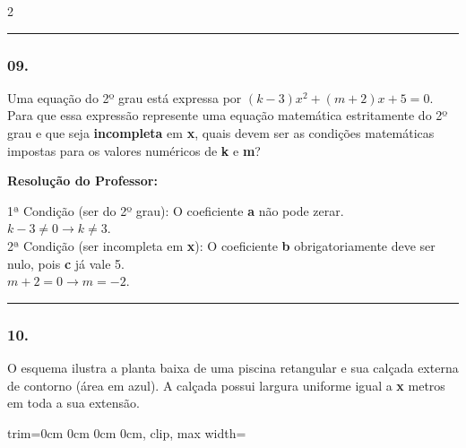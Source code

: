\begin{multicols*}{2}
\par\vspace{\espacoQuestao}

\noindent\textcolor{CorLinha}{\rule{\linewidth}{0.5pt}} 
\par\vspace{\espacoPreQuestao}
\subsubsection*{09.} Uma equação do 2º grau está expressa por $ (k - 3)x^2 + (m + 2)x + 5 = 0 $. Para que essa expressão represente uma equação matemática estritamente do 2º grau e que seja \textbf{incompleta} em \textbf{x}, quais devem ser as condições matemáticas impostas para os valores numéricos de \textbf{k} e \textbf{m}?

\ifgabarito
    \begin{tcolorbox}[colback=CorTitUm!5, colframe=CorTitUm, boxrule=1pt, arc=4pt, left=6pt, right=6pt, top=6pt, bottom=6pt]
    \small\textbf{\textcolor{CorTitUm}{Resolução do Professor:}}\par\vspace{0.1cm}
    \color{CinzaEscuro}
    1ª Condição (ser do 2º grau): O coeficiente \textbf{a} não pode zerar.\\
    $k - 3 \neq 0 \rightarrow k \neq 3$.\\
    2ª Condição (ser incompleta em \textbf{x}): O coeficiente \textbf{b} obrigatoriamente deve ser nulo, pois \textbf{c} já vale 5.\\
    $m + 2 = 0 \rightarrow m = -2$.
    \end{tcolorbox}
\fi

\par\vspace{\espacoQuestao}

\noindent\textcolor{CorLinha}{\rule{\linewidth}{0.5pt}} 
\par\vspace{\espacoPreQuestao}
\subsubsection*{10.} O esquema ilustra a planta baixa de uma piscina retangular e sua calçada externa de contorno (área em azul). A calçada possui largura uniforme igual a \textbf{x} metros em toda a sua extensão. 

\begin{center}
\begin{adjustbox}{trim=0cm 0cm 0cm 0cm, clip, max width=\larguraTikz}
\end{adjustbox}
\end{center}
\end{multicols*}
